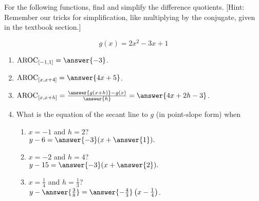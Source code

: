 \documentclass{ximera}
\author{Elizabeth Campolongo}
\begin{document}
\begin{exercise}

For the following functions, 
find and simplify the difference quotients. [Hint: Remember our tricks for simplification, like multiplying by the conjugate, given in the textbook section.]

$$g(x)= 2x^2 -3x+1$$

\begin{enumerate}

\item $\av_{[-1,1]} = \answer{-3}$.

\item $\av_{[x,x+4]} =  \answer{4x+5}$.

\item $\av_{[x,x+h]} = \frac{\answer{g(x+h)}-g(x)}{\answer{h}}  = \answer{4x + 2h - 3}$.  

\item What is the equation of the secant line to $g$ (in point-slope form) when 
\begin{enumerate}
\item $x=-1$ and $h = 2$? \\
$y-6= \answer{-3}(x +\answer{1}).$

\item $x=-2$ and $h = 4$? \\
$y - 15 = \answer{-3}(x +\answer{2}).$

\item $x=\frac{1}{4}$ and $h = \frac{1}{3}$?\\
$y -\answer{\frac{3}{8}} = \answer{-\frac{4}{3}}\left(x-\frac{1}{4}\right)$.
\end{enumerate}


\end{enumerate}
\end{exercise}
\end{document}
